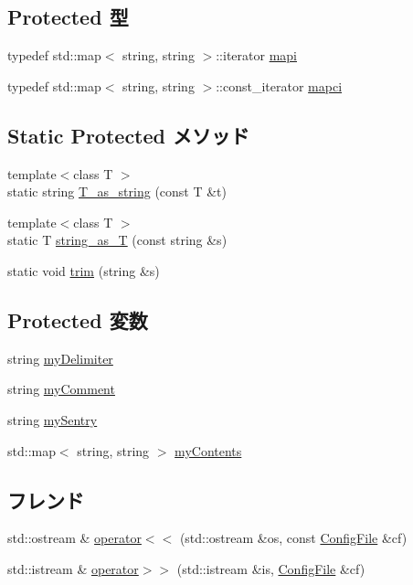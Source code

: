 \subsection*{Protected 型}
\begin{DoxyCompactItemize}
\item 
typedef std::map$<$ string, string $>$::iterator \hyperlink{classConfigFile_a6eae9b2b09d40f1620dfaa1430405113}{mapi}
\item 
typedef std::map$<$ string, string $>$::const\_\-iterator \hyperlink{classConfigFile_a09401403dcfe6bf8cb142b5abe7d9b04}{mapci}
\end{DoxyCompactItemize}
\subsection*{Static Protected メソッド}
\begin{DoxyCompactItemize}
\item 
{\footnotesize template$<$class T $>$ }\\static string \hyperlink{classConfigFile_a149d917011dbfb103a47c5a7cf3a446f}{T\_\-as\_\-string} (const T \&t)
\item 
{\footnotesize template$<$class T $>$ }\\static T \hyperlink{classConfigFile_a6bfbf02be3870556c253a58b9e3b0700}{string\_\-as\_\-T} (const string \&s)
\item 
static void \hyperlink{classConfigFile_a8bddc3dcbfa8ff455abebaf144a1f5cf}{trim} (string \&s)
\end{DoxyCompactItemize}
\subsection*{Protected 変数}
\begin{DoxyCompactItemize}
\item 
string \hyperlink{classConfigFile_acfa392eb20e5a977f077a3e96bad6bf7}{myDelimiter}
\item 
string \hyperlink{classConfigFile_a1112d00b3f3aa676ca93e148a6f3792f}{myComment}
\item 
string \hyperlink{classConfigFile_a1f5ee3be5d9f07feb3d1dc9a2f22ccfa}{mySentry}
\item 
std::map$<$ string, string $>$ \hyperlink{classConfigFile_a3ab1162ad6495f6102af2082df0bfa3b}{myContents}
\end{DoxyCompactItemize}
\subsection*{フレンド}
\begin{DoxyCompactItemize}
\item 
std::ostream \& \hyperlink{classConfigFile_a8ccacbc37db1992a5515e2c72fc83ce6}{operator$<$$<$} (std::ostream \&os, const \hyperlink{classConfigFile}{ConfigFile} \&cf)
\item 
std::istream \& \hyperlink{classConfigFile_a25042475439039e70f90febe7d0e63ec}{operator$>$$>$} (std::istream \&is, \hyperlink{classConfigFile}{ConfigFile} \&cf)
\end{DoxyCompactItemize}



